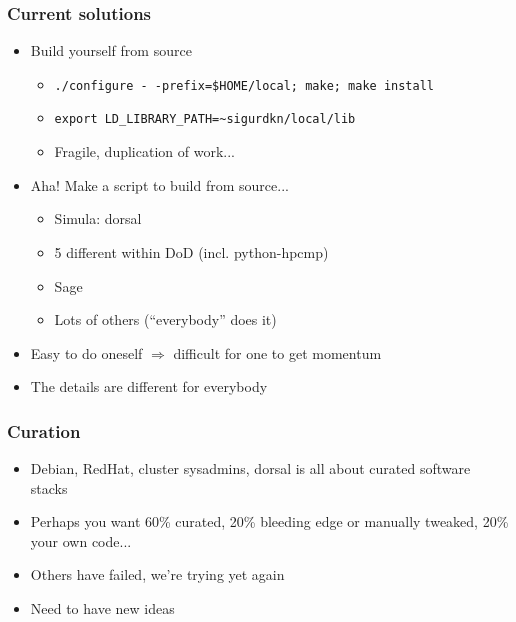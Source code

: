 \documentclass[sans,mathserif]{beamer}
\begin{document}
\begin{frame}
  \frametitle{Current solutions}
  \begin{itemize}
  \item<+-> Build yourself from source
    \begin{itemize}
    \item<+-> {\tt ./configure -\,{}-prefix=\$HOME/local; make; make install}
    \item<+-> {\tt export LD\_LIBRARY\_PATH=\textasciitilde{}sigurdkn/local/lib}
    \item<+-> Fragile, duplication of work...
    \end{itemize}
  \item<+-> Aha! Make a script to build from source...
    \begin{itemize}
    \item Simula: dorsal
    \item 5 different within DoD (incl. python-hpcmp)
    \item Sage
    \item Lots of others (``everybody'' does it)
    \end{itemize}
  \item<+-> Easy to do oneself $\Rightarrow$ difficult for one to get
    momentum
  \item<+-> The details are different for everybody
  \end{itemize}

\end{frame}


\begin{frame}
  \frametitle{Curation}
  
  \begin{itemize}
  \item<+-> Debian, RedHat, cluster sysadmins, dorsal is all about curated software stacks
  \item<+-> Perhaps you want 60\% curated, 20\% bleeding edge or manually tweaked, 20\% your own code...
  \end{itemize}
\end{frame}


\begin{frame}
  \begin{itemize}
  \item<+-> Others have failed, we're trying yet again
  \item<+-> Need to have new ideas
  \end{itemize}
\end{frame}
\end{document}
